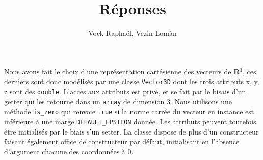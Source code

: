 \documentclass[12pt, letterpaper, twoside]{article}
\title{Réponses}
\author{Vock Raphaël, Vezin Lomàn}
\begin{document}
Nous avons fait le choix d'une représentation cartésienne des vecteurs de \textbf{R}$^3$, ces derniers sont donc modélisés par une classe \texttt{Vector3D} dont les trois attributs x, y, z sont des \texttt{double}. L'accès aux attributs est privé, et se fait par le bisais d'un getter qui les retourne dans un \texttt{array} de dimension 3. Nous utilisons une méthode \texttt{is\_zero} qui renvoie \texttt{true} si la norme carrée du vecteur en instance est inférieure à une marge \texttt{DEFAULT\_EPSILON} donnée. Les attributs peuvent toutefois être initialisés par le biais s'un setter. La classe dispose de plus d'un constructeur faisant également office de constructeur par défaut, initialisant en l'absence d'argument chacune des coordonnées à 0.
\end{document}
